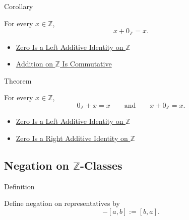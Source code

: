 \begin{corollarybox}{Corollary}
\begin{corollary}
\label{cor:zero-right-additive-identity-on-z}
For every $x\in\mathbb{Z}$,
\[
x+0_{\mathbb{Z}}=x.
\]
\end{corollary}
\end{corollarybox}

\begin{dependencies}
\begin{itemize}
  \item \hyperref[thm:zero-left-additive-identity-on-z]{Zero Is a Left Additive Identity on $\mathbb{Z}$}
  \item \hyperref[thm:addition-on-z-commutative]{Addition on $\mathbb{Z}$ Is Commutative}
\end{itemize}
\end{dependencies}

\begin{theorembox}{Theorem}
\begin{theorem}
\label{thm:zero-additive-identity-on-z}
For every $x\in\mathbb{Z}$,
\[
0_{\mathbb{Z}}+x=x
\qquad\text{and}\qquad
x+0_{\mathbb{Z}}=x.
\]
\end{theorem}
\end{theorembox}

\begin{dependencies}
\begin{itemize}
  \item \hyperref[thm:zero-left-additive-identity-on-z]{Zero Is a Left Additive Identity on $\mathbb{Z}$}
  \item \hyperref[cor:zero-right-additive-identity-on-z]{Zero Is a Right Additive Identity on $\mathbb{Z}$}
\end{itemize}
\end{dependencies}

\subsection*{\texorpdfstring{Negation on $\mathbb{Z}$-Classes}{Negation on Z-Classes}}

\begin{definitionbox}{Definition}
\begin{definition}
\label{def:negation-on-z-classes}
Define negation on representatives by
\[
-[a,b]:=[b,a].
\]
\end{definition}
\end{definitionbox}

